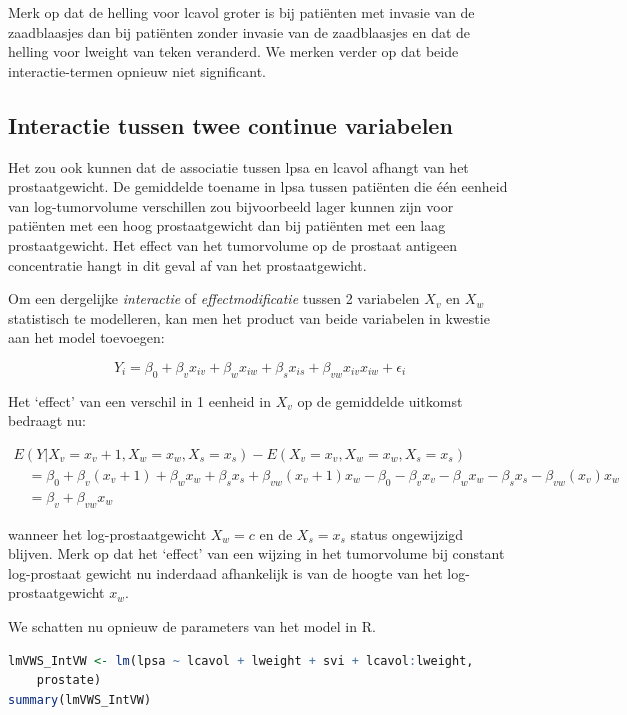 \documentclass[
  12pt,dutch,coursenotes]{book}
\theoremstyle{definition}
\theoremstyle{definition}
\theoremstyle{definition}
\theoremstyle{definition}
\theoremstyle{remark}
\begin{document}
Merk op dat de helling voor lcavol groter is bij patiënten met invasie van de zaadblaasjes dan bij patiënten zonder invasie van de zaadblaasjes en dat de helling voor lweight van teken veranderd. We merken verder op dat beide interactie-termen opnieuw niet significant.

\hypertarget{sec:intCont}{%
\subsection{Interactie tussen twee continue variabelen}\label{sec:intCont}}

Het zou ook kunnen dat de associatie tussen lpsa en lcavol afhangt van het prostaatgewicht. De gemiddelde toename in lpsa tussen patiënten die één eenheid van log-tumorvolume verschillen zou bijvoorbeeld lager kunnen zijn voor patiënten met een hoog prostaatgewicht dan bij patiënten met een laag prostaatgewicht. Het effect van het tumorvolume op de prostaat antigeen concentratie hangt in dit geval af van het prostaatgewicht.

Om een dergelijke \textit{interactie} of \textit{effectmodificatie} tussen 2 variabelen \(X_v\) en \(X_w\) statistisch te modelleren, kan men het product van beide variabelen in kwestie aan het model toevoegen:

\[
Y_i = \beta_0 + \beta_v x_{iv} + \beta_w x_{iw} +\beta_s x_{is} + \beta_{vw} x_{iv}x_{iw} +\epsilon_i
\]

Het `effect' van een verschil in 1 eenheid in \(X_v\) op de gemiddelde uitkomst bedraagt nu:

\[
\begin{array}{l}
E(Y|X_v=x_v+1,X_w=x_w,X_s=x_s) − E(X_v=x_v,X_w=x_w,X_s=x_s) \\
\quad = \beta_0 + \beta_v (x_{v}+1) + \beta_w x_w +\beta_s x_{s} + \beta_{vw} (x_{v}+1) x_w - \beta_0 - \beta_v x_{v} - \beta_w x_w -\beta_s x_{s} - \beta_{vw} (x_{v}) x_w \\
\quad = \beta_v +  \beta_{vw} x_w
 \end{array}
\]

wanneer het log-prostaatgewicht \(X_w=c\) en de \(X_s=x_s\) status ongewijzigd blijven. Merk op dat het `effect' van een wijzing in het tumorvolume bij
constant log-prostaat gewicht nu inderdaad afhankelijk is van de hoogte van het log-prostaatgewicht \(x_w\).

We schatten nu opnieuw de parameters van het model in R.

\begin{lstlisting}[language=R]
lmVWS_IntVW <- lm(lpsa ~ lcavol + lweight + svi + lcavol:lweight,
    prostate)
summary(lmVWS_IntVW)
\end{lstlisting}
\end{document}
